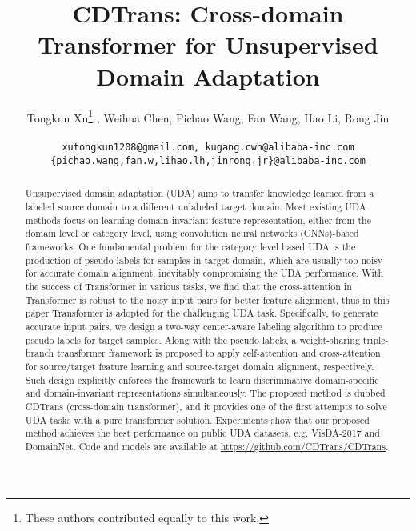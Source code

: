 \documentclass[dvipsnames, svgnames, x11names, table]{article} \usepackage{iclr2022_conference,times}
\title{CDTrans: Cross-domain Transformer for Unsupervised Domain Adaptation}
\author{Tongkun Xu\thanks{These authors contributed equally to this work.} , Weihua Chen, Pichao Wang, Fan Wang, Hao Li, Rong Jin \\
\text{Alibaba Group, Shandong University} \\
\texttt{xutongkun1208@gmail.com, kugang.cwh@alibaba-inc.com} \\ 
\texttt{\{pichao.wang,fan.w,lihao.lh,jinrong.jr\}@alibaba-inc.com}
}
\begin{document}
\begin{spacing}{1.0}
\maketitle
\vspace{-3mm}
\begin{abstract}
Unsupervised domain adaptation (UDA) aims to transfer knowledge learned from a labeled source domain to a different unlabeled target domain. Most existing UDA methods focus on learning domain-invariant feature representation, either from the domain level or category level, using convolution neural networks (CNNs)-based frameworks. One fundamental problem for the category level based UDA is the production of pseudo labels for samples in target domain, which are usually too noisy for accurate domain alignment, inevitably compromising the UDA performance.  With the success of Transformer in various tasks, we find that the cross-attention in Transformer is robust to the noisy input pairs for better feature alignment, thus in this paper Transformer is adopted for the challenging UDA task. Specifically, to generate accurate input pairs, we design a two-way center-aware labeling algorithm to produce pseudo labels for target samples. Along with the pseudo labels, a weight-sharing triple-branch transformer framework is proposed to apply self-attention and cross-attention for source/target feature learning and source-target domain alignment, respectively. 
Such design explicitly enforces the framework to learn discriminative domain-specific and domain-invariant representations simultaneously. The proposed method is dubbed CDTrans (cross-domain transformer), and it provides one of the first attempts to solve UDA tasks with a pure transformer solution.
Experiments show that our proposed method achieves the best performance on public UDA datasets, e.g. VisDA-2017 and DomainNet. Code and models are available at \url{https://github.com/CDTrans/CDTrans}.
\end{abstract}


\end{spacing}
\end{document}
